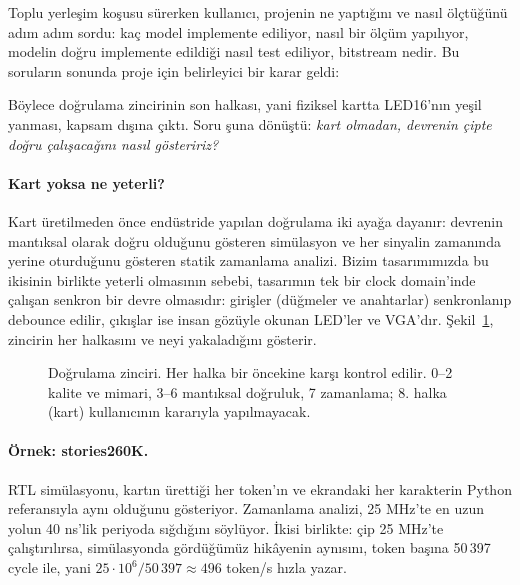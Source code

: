 
\neden
Toplu yerleşim koşusu sürerken kullanıcı, projenin ne yaptığını ve nasıl ölçtüğünü adım adım sordu: kaç model implemente ediliyor, nasıl bir ölçüm yapılıyor, modelin doğru implemente edildiği nasıl test ediliyor, bitstream nedir. Bu soruların sonunda proje için belirleyici bir karar geldi:


Böylece doğrulama zincirinin son halkası, yani fiziksel kartta LED16'nın yeşil yanması, kapsam dışına çıktı. Soru şuna dönüştü: \emph{kart olmadan, devrenin çipte doğru çalışacağını nasıl gösteririz?}

\neyapildi
\paragraph{Kart yoksa ne yeterli?} Kart üretilmeden önce endüstride yapılan doğrulama iki ayağa dayanır: devrenin mantıksal olarak doğru olduğunu gösteren simülasyon ve her sinyalin zamanında yerine oturduğunu gösteren statik zamanlama analizi. Bizim tasarımımızda bu ikisinin birlikte yeterli olmasının sebebi, tasarımın tek bir clock domain'inde çalışan senkron bir devre olmasıdır: girişler (düğmeler ve anahtarlar) senkronlanıp debounce edilir, çıkışlar ise insan gözüyle okunan LED'ler ve VGA'dır. Şekil~\ref{fig:zincir}, zincirin her halkasını ve neyi yakaladığını gösterir.

\begin{figure}[htb]
\centering
{}
\caption{Doğrulama zinciri. Her halka bir öncekine karşı kontrol edilir. 0–2 kalite ve mimari, 3–6 mantıksal doğruluk, 7 zamanlama; 8. halka (kart) kullanıcının kararıyla yapılmayacak.}
\label{fig:zincir}
\end{figure}

\paragraph{Örnek: stories260K.} RTL simülasyonu, kartın ürettiği her token'ın ve ekrandaki her karakterin Python referansıyla aynı olduğunu gösteriyor. Zamanlama analizi, 25 MHz'te en uzun yolun 40 ns'lik periyoda sığdığını söylüyor. İkisi birlikte: çip 25 MHz'te çalıştırılırsa, simülasyonda gördüğümüz hikâyenin aynısını, token başına 50\,397 cycle ile, yani $25\cdot10^6/50\,397 \approx 496$ token/s hızla yazar.

